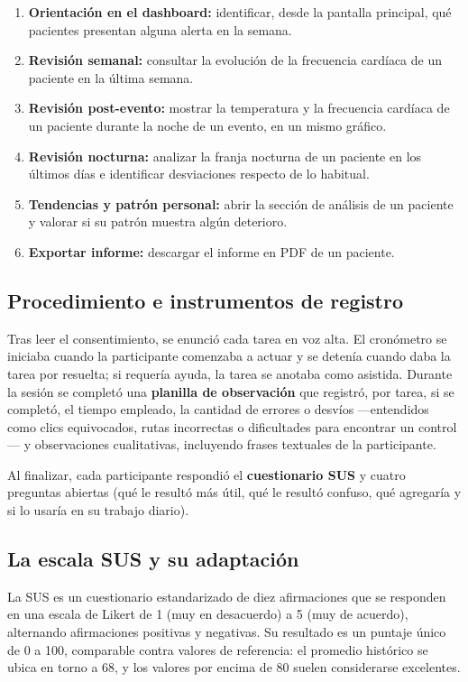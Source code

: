 \documentclass[12pt,a4paper]{article}
\begin{document}
    \begin{enumerate}
        \item \textbf{Orientación en el dashboard:} identificar, desde la pantalla principal, qué pacientes presentan alguna alerta en la semana.
        \item \textbf{Revisión semanal:} consultar la evolución de la frecuencia cardíaca de un paciente en la última semana.
        \item \textbf{Revisión post-evento:} mostrar la temperatura y la frecuencia cardíaca de un paciente durante la noche de un evento, en un mismo gráfico.
        \item \textbf{Revisión nocturna:} analizar la franja nocturna de un paciente en los últimos días e identificar desviaciones respecto de lo habitual.
        \item \textbf{Tendencias y patrón personal:} abrir la sección de análisis de un paciente y valorar si su patrón muestra algún deterioro.
        \item \textbf{Exportar informe:} descargar el informe en PDF de un paciente.
    \end{enumerate}

    \subsection{Procedimiento e instrumentos de registro}
    Tras leer el consentimiento, se enunció cada tarea en voz alta. El cronómetro se iniciaba cuando la participante comenzaba a actuar y se detenía cuando daba la tarea por resuelta; si requería ayuda, la tarea se anotaba como asistida. Durante la sesión se completó una \textbf{planilla de observación} que registró, por tarea, si se completó, el tiempo empleado, la cantidad de errores o desvíos —entendidos como clics equivocados, rutas incorrectas o dificultades para encontrar un control— y observaciones cualitativas, incluyendo frases textuales de la participante.

    Al finalizar, cada participante respondió el \textbf{cuestionario SUS} y cuatro preguntas abiertas (qué le resultó más útil, qué le resultó confuso, qué agregaría y si lo usaría en su trabajo diario).

    \subsection{La escala SUS y su adaptación}
    La SUS es un cuestionario estandarizado de diez afirmaciones que se responden en una escala de Likert de 1 (muy en desacuerdo) a 5 (muy de acuerdo), alternando afirmaciones positivas y negativas. Su resultado es un puntaje único de 0 a 100, comparable contra valores de referencia: el promedio histórico se ubica en torno a 68, y los valores por encima de 80 suelen considerarse excelentes.
\end{document}

